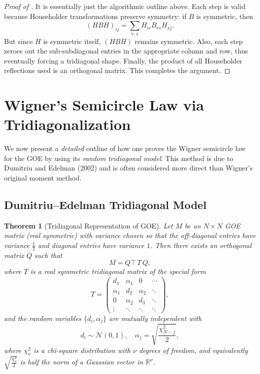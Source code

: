 \documentclass[letterpaper,11pt,oneside,reqno]{article}
\numberwithin{equation}{section}
\newtheorem{theorem}[proposition]{Theorem}
\theoremstyle{definition}
\begin{document}
\begin{proof}[Proof of ]
It is essentially just the algorithmic outline above.  Each step is valid because Householder transformations preserve symmetry: if \(B\) is symmetric, then
\[
  (H B H)_{ij}
  = \sum_{r,s} H_{ir} B_{rs} H_{sj}.
\]
But since \(H\) is symmetric itself, \((H B H)\) remains symmetric.  Also, each step zeroes out the sub-subdiagonal entries in the appropriate column and row, thus eventually forcing a tridiagonal shape.  Finally, the product of all Householder reflections used is an orthogonal matrix. This completes the argument.
\end{proof}

\section{Wigner’s Semicircle Law via Tridiagonalization}
\label{sec:Wigner-SC-detailed}

We now present a \emph{detailed} outline of how one proves the Wigner semicircle law for the GOE by using its \emph{random tridiagonal model}. This method is due to Dumitriu and Edelman (2002) and is often considered more direct than Wigner’s original moment method.

\subsection{Dumitriu–Edelman Tridiagonal Model}

\begin{theorem}[Tridiagonal Representation of GOE]
\label{thm:DE-model}
Let \(M\) be an \(N\times N\) GOE matrix (real symmetric) with variance chosen so that the off-diagonal entries have variance \(\tfrac12\) and diagonal entries have variance \(1\).  Then there exists an orthogonal matrix \(Q\) such that
\[
   M = Q\top\,T\,Q,
\]
where \(T\) is a real symmetric tridiagonal matrix of the special form
\[
   T = \begin{pmatrix}
         d_1 & \alpha_1 & 0 & \cdots \\
         \alpha_1 & d_2 & \alpha_2 & \ddots \\
         0 & \alpha_2 & d_3 & \ddots \\
         \vdots & \ddots & \ddots & \ddots
       \end{pmatrix},
\]
and the random variables \(\{d_i,\alpha_j\}\) are mutually independent with
\[
  d_i \sim \mathcal{N}(0,1),
  \quad
  \alpha_j = \sqrt{\frac{\chi^2_{N-j}}{2}},
\]
where \(\chi^2_{\nu}\) is a chi-square distribution with \(\nu\) degrees of freedom, and equivalently \(\sqrt{\tfrac{\chi^2_\nu}{2}}\) is half the norm of a Gaussian vector in \(\mathbb{R}^\nu\).
\end{theorem}
\end{document}
